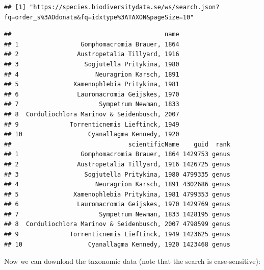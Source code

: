 \documentclass[
  10pt,
]{article}
\newenvironment{Shaded}{\begin{snugshade}}{\end{snugshade}}
\newcommand{\FunctionTok}[1]{\textcolor[rgb]{0.00,0.00,0.00}{#1}}
\newcommand{\NormalTok}[1]{#1}
\newcommand{\SpecialCharTok}[1]{\textcolor[rgb]{0.00,0.00,0.00}{#1}}
\newcommand{\StringTok}[1]{\textcolor[rgb]{0.31,0.60,0.02}{#1}}
\begin{document}
\begin{verbatim}
## [1] "https://species.biodiversitydata.se/ws/search.json?fq=order_s%3AOdonata&fq=idxtype%3ATAXON&pageSize=10"
\end{verbatim}

\begin{Shaded}
\end{Shaded}

\begin{verbatim}
##                                          name
## 1                 Gomphomacromia Brauer, 1864
## 2                Austropetalia Tillyard, 1916
## 3                  Sogjutella Pritykina, 1980
## 4                     Neuragrion Karsch, 1891
## 5               Xamenophlebia Pritykina, 1981
## 6                Lauromacromia Geijskes, 1970
## 7                      Sympetrum Newman, 1833
## 8  Corduliochlora Marinov & Seidenbusch, 2007
## 9              Torrenticnemis Lieftinck, 1949
## 10                  Cyanallagma Kennedy, 1920
##                                scientificName    guid  rank
## 1                 Gomphomacromia Brauer, 1864 1429753 genus
## 2                Austropetalia Tillyard, 1916 1426725 genus
## 3                  Sogjutella Pritykina, 1980 4799335 genus
## 4                     Neuragrion Karsch, 1891 4302686 genus
## 5               Xamenophlebia Pritykina, 1981 4799353 genus
## 6                Lauromacromia Geijskes, 1970 1429769 genus
## 7                      Sympetrum Newman, 1833 1428195 genus
## 8  Corduliochlora Marinov & Seidenbusch, 2007 4798599 genus
## 9              Torrenticnemis Lieftinck, 1949 1423625 genus
## 10                  Cyanallagma Kennedy, 1920 1423468 genus
\end{verbatim}

Now we can download the taxonomic data (note that the search is case-sensitive):
\end{document}
